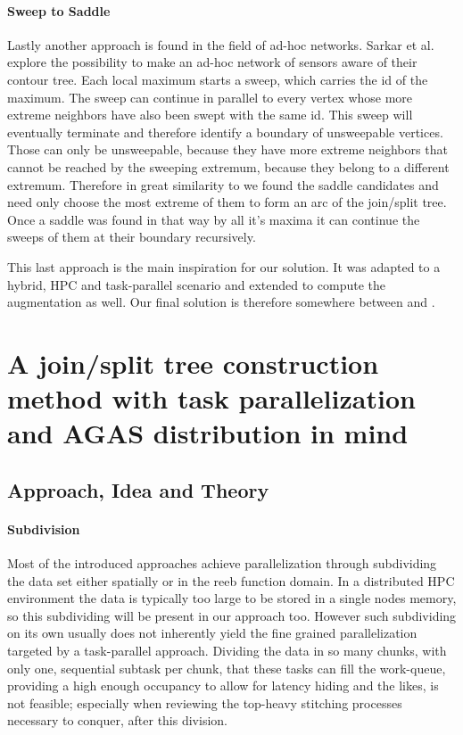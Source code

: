 \documentclass{scrartcl}
\begin{document}
\paragraph{Sweep to Saddle}
Lastly another approach is found in the field of ad-hoc networks. Sarkar et al. \cite{adhoc} explore the possibility to make an ad-hoc network of sensors aware of their contour tree. Each local maximum starts a sweep, which carries the id of the maximum. The sweep can continue in parallel to every vertex whose more extreme neighbors have also been swept with the same id. This sweep will eventually terminate and therefore identify a boundary of unsweepable vertices. Those can only be unsweepable, because they have more extreme neighbors that cannot be reached by the sweeping extremum, because they belong to a different extremum. Therefore in great similarity to \cite{Carr} we found the saddle candidates and need only choose the most extreme of them to form an arc of the join/split tree. Once a saddle was found in that way by all it's maxima it can continue the sweeps of them at their boundary recursively.

This last approach is the main inspiration for our solution. It was adapted to a hybrid, HPC and task-parallel scenario and extended to compute the augmentation as well. Our final solution is therefore somewhere between \cite{Carr} and \cite{adhoc}.

\section{A join/split tree construction method with task parallelization and AGAS distribution in mind}

\subsection{Approach, Idea and Theory}

\paragraph{Subdivision}
Most of the introduced approaches achieve parallelization through subdividing the data set either spatially or in the reeb function domain. In a distributed HPC environment the data is typically too large to be stored in a single nodes memory, so this subdividing will be present in our approach too. However such subdividing on its own usually does not inherently yield the fine grained parallelization targeted by a task-parallel approach. Dividing the data in so many chunks, with only one, sequential subtask per chunk, that these tasks can fill the work-queue, providing a high enough occupancy to allow for latency hiding and the likes, is not feasible; especially when reviewing the top-heavy stitching processes necessary to conquer, after this division. 
\end{document}
